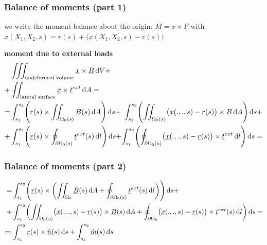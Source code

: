 \begin{frame}
  \frametitle{Balance of moments (part 1)}
  
  we write the moment balance about the origin: $\underline{M} = \underline{x} \times \underline{F}$ \newline
  with $\underline{x}(X_1,X_2,s) = \underline{r}(s) + \bigl( \underline{x}(X_1,X_2,s) - \underline{r}(s) \bigr)$
  \vspace{0.5em}
  
  \textbf{moment due to external loads}
  \begin{displaymath}
    \begin{alignedat}{2}
      &\iiint_{\text{undeformed volume}} \underline{x} \times \underline{B} \dif V + &\\
       + &\iint_{\text{lateral surface}} \underline{x} \times \underline{t}^{ext} \dif A = &\\
      = &\int_{s_1}^{s_2} \Biggl( \underline{r}(s) \times \iint_{\Omega_{0}(s)} \underline{B}(s) \dif A \Biggr) \dif s +
        &\int_{s_1}^{s_2} \Biggl( \iint_{\Omega_{0}(s)} \bigl( \underline{x}(.,.,s) - \underline{r}(s) \bigr) \times \underline{B} \dif A \Biggr) \dif s + \\
        + &\int_{s_1}^{s_2} \Biggl( \underline{r}(s) \times \oint_{\partial \Omega_{0}(s)} \underline{t}^{ext}(s) \dif l \Biggr) \dif s +
        &\int_{s_1}^{s_2} \Biggl( \oint_{\partial \Omega_{0}(s)} \bigl( \underline{x}(.,.,s) - \underline{r}(s) \bigr) \times \underline{t}^{ext} \dif l \Biggr) \dif s =
    \end{alignedat}
  \end{displaymath}
\end{frame}



\begin{frame}
  \frametitle{Balance of moments (part 2)}
  \begin{displaymath}
    \begin{alignedat}{1}
      = &\int_{s_1}^{s_2} \Biggl( \underline{r}(s) \times \biggl( \iint_{\Omega_0} \underline{B}(s) \dif A + \oint_{\partial \Omega_{0}(s)} \underline{t}^{ext}(s) \dif l \biggr) \Biggr) \dif s + \\
        + &\int_{s_1}^{s_2} \biggl( \iint_{\Omega_{0}(s)} \bigl( \underline{x}(.,.,s) - \underline{r}(s) \bigr) \times \underline{B}(s) \dif A + \oint_{\partial \Omega_0} \bigl( \underline{x}(.,.,s) - \underline{r}(s) \bigr) \times \underline{t}^{ext}(s) \dif l \biggr) \dif s = \\
      =: &\int_{s_1}^{s_2} \underline{r}(s) \times \underline{\hat{n}}(s) \dif s +
        \int_{s_1}^{s_2} \underline{\hat{m}}(s) \dif s
    \end{alignedat}
  \end{displaymath}
\end{frame}


